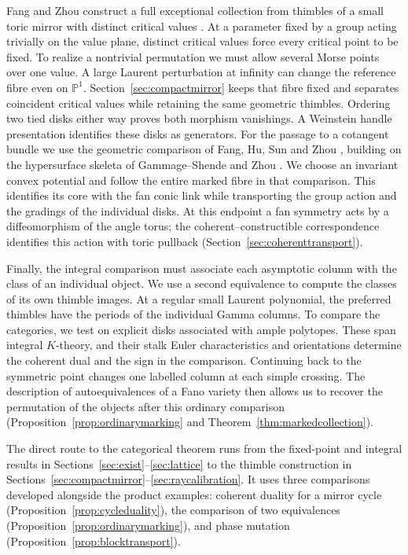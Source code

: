 \documentclass[11pt]{amsart}
\theoremstyle{definition}
\begin{document}
Fang and Zhou construct a full exceptional collection from thimbles of a small toric mirror with distinct critical values \cite[Proposition~5.4]{FZ}. At a parameter fixed by a group acting trivially on the value plane, distinct critical values force every critical point to be fixed. To realize a nontrivial permutation we must allow several Morse points over one value. A large Laurent perturbation at infinity can change the reference fibre even on $\mathbb P^1$. Section~\ref{sec:compactmirror} keeps that fibre fixed and separates coincident critical values while retaining the same geometric thimbles. Ordering two tied disks either way proves both morphism vanishings. A Weinstein handle presentation identifies these disks as generators. For the passage to a cotangent bundle we use the geometric comparison of Fang, Hu, Sun and Zhou \cite{FHSZ}, building on the hypersurface skeleta of Gammage--Shende and Zhou \cite{GS,Zhou}. We choose an invariant convex potential and follow the entire marked fibre in that comparison. This identifies its core with the fan conic link while transporting the group action and the gradings of the individual disks. At this endpoint a fan symmetry acts by a diffeomorphism of the angle torus; the coherent--constructible correspondence identifies this action with toric pullback (Section~\ref{sec:coherenttransport}).

Finally, the integral comparison must associate each asymptotic column with the class of an individual object. We use a second equivalence to compute the classes of its own thimble images. At a regular small Laurent polynomial, the preferred thimbles have the periods of the individual Gamma columns. To compare the categories, we test on explicit disks associated with ample polytopes. These span integral $K$-theory, and their stalk Euler characteristics and orientations determine the coherent dual and the sign in the comparison. Continuing back to the symmetric point changes one labelled column at each simple crossing. The description of autoequivalences of a Fano variety then allows us to recover the permutation of the objects after this ordinary comparison (Proposition~\ref{prop:ordinarymarking} and Theorem~\ref{thm:markedcollection}).

The direct route to the categorical theorem runs from the fixed-point and integral results in Sections~\ref{sec:exist}--\ref{sec:lattice} to the thimble construction in Sections~\ref{sec:compactmirror}--\ref{sec:raycalibration}. It uses three comparisons developed alongside the product examples: coherent duality for a mirror cycle (Proposition~\ref{prop:cycleduality}), the comparison of two equivalences (Proposition~\ref{prop:ordinarymarking}), and phase mutation (Proposition~\ref{prop:blocktransport}).
\end{document}
